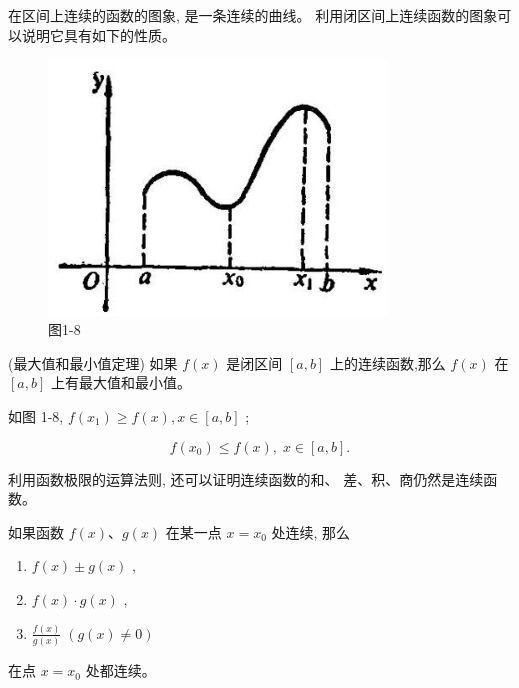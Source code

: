\documentclass[lang=cn,newtx,12pt,scheme=chinese]{elegantbook}
\begin{document}
在区间上连续的函数的图象, 是一条连续的曲线。 利用闭区间上连续函数的图象可以说明它具有如下的性质。

\begin{figure}[h]
	\centering
	\includegraphics[max width=0.8\textwidth]{images/01912c18-5c3f-733d-b775-749ba9897a9d_34_898703.jpg}
	\caption{图1-8}
\end{figure}

\begin{property}
(最大值和最小值定理) 如果 \(f\left( x\right)\) 是闭区间 \(\left\lbrack {a,b}\right\rbrack\) 上的连续函数,那么 \(f\left( x\right)\) 在 \(\left\lbrack {a,b}\right\rbrack\) 上有最大值和最小值。
\end{property}

如图 1-8, \(f\left( {x}_{1}\right) \geq f\left( x\right) ,x \in \left\lbrack {a,b}\right\rbrack\) ;

\[
f\left( {x}_{0}\right) \leq f\left( x\right) ,\;x \in \left\lbrack {a,b}\right\rbrack .
\]

利用函数极限的运算法则, 还可以证明连续函数的和、 差、积、商仍然是连续函数。

\begin{property}

如果函数 \(f\left( x\right) \text{、}g\left( x\right)\) 在某一点 \(x = {x}_{0}\) 处连续, 那么

\begin{enumerate}
\item \(f\left( x\right) \pm g\left( x\right)\) ,
\item \(f\left( x\right) \cdot g\left( x\right)\) ,
\item \(\frac{f\left( x\right) }{g\left( x\right) }\;\left( {g\left( x\right) \neq 0}\right)\)
\end{enumerate}

在点 \(x = {x}_{0}\) 处都连续。

\end{property}
\end{document}
